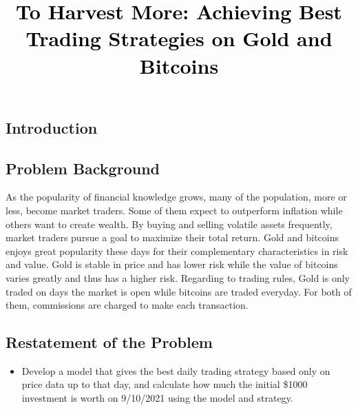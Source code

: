 \documentclass[12pt,a4paper]{article}
\newcommand{\PaperTitle}{To Harvest More: Achieving Best Trading Strategies on Gold and Bitcoins}  %
\begin{document}
\thispagestyle{empty}


\newpage

\title{
\Large{\textcolor{black}{\PaperTitle}}
}




\maketitle



\tableofcontents
\setcounter{tocdepth}{2}

\newpage
\setcounter{page}{1}


\begin{spacing}{1.2} 



\section{Introduction}
\label{Problem_Statement}

\subsection{Problem Background}
As the popularity of financial knowledge grows, many of the population, more or less, become market traders. Some of them expect to outperform inflation while others want to create wealth. By buying and selling volatile assets frequently, market traders pursue a goal to maximize their total return. Gold and bitcoins enjoys great popularity these days for their complementary characteristics in risk and value. Gold is stable in price and has lower risk while the value of bitcoins varies greatly and thus has a higher risk. Regarding to trading rules, Gold is only traded on days the market is open while bitcoins are traded everyday. For both of them, commissions are charged to make each transaction.

\subsection{Restatement of the Problem}

\begin{itemize}
	\item Develop a model that gives the best daily trading strategy based only on price data up 
	to that day, and calculate how much the initial \$1000 investment is worth on 9/10/2021 using the 
	model and strategy.
	

\end{itemize}
\end{spacing}
\end{document}
